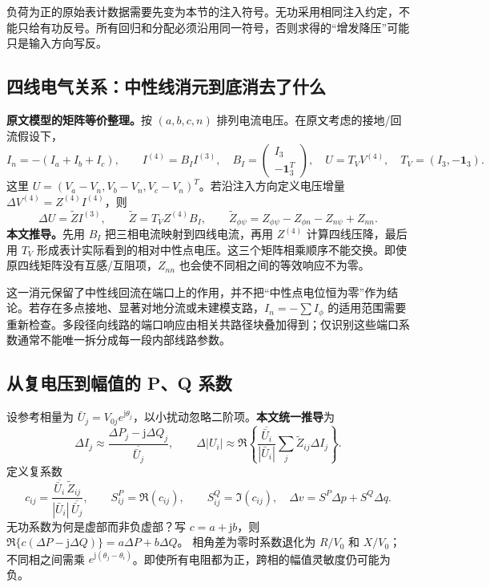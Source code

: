 负荷为正的原始表计数据需要先变为本节的注入符号。无功采用相同注入约定，不能只给有功反号。所有回归和分配必须沿用同一符号，否则求得的“增发降压”可能只是输入方向写反。

\subsection{四线电气关系：中性线消元到底消去了什么}

\textbf{原文模型的矩阵等价整理。}按 $(a,b,c,n)$ 排列电流电压。在原文考虑的接地/回流假设下，
\begin{equation}
 I_n=-(I_a+I_b+I_c),\qquad
 I^{(4)}=B_I I^{(3)},\quad
 B_I=\begin{pmatrix}I_3\\-\boldsymbol1_3^T\end{pmatrix},\quad
 U=T_VV^{(4)},\quad T_V=(I_3,-\boldsymbol1_3).
 \label{eq:oe_s10_neutral}
\end{equation}
这里 $U=(V_a-V_n,V_b-V_n,V_c-V_n)^T$。若沿注入方向定义电压增量
$\Delta V^{(4)}=Z^{(4)}I^{(4)}$，则
\begin{equation}
 \Delta U=\widetilde ZI^{(3)},\qquad
 \widetilde Z=T_VZ^{(4)}B_I,\qquad
 \widetilde Z_{\phi\psi}=Z_{\phi\psi}-Z_{\phi n}-Z_{n\psi}+Z_{nn}.
 \label{eq:oe_s10_fourwire}
\end{equation}
\textbf{本文推导。}先用 $B_I$ 把三相电流映射到四线电流，再用 $Z^{(4)}$ 计算四线压降，最后用 $T_V$ 形成表计实际看到的相对中性点电压。这三个矩阵相乘顺序不能交换。即使原四线矩阵没有互感/互阻项，$Z_{nn}$ 也会使不同相之间的等效响应不为零。

这一消元保留了中性线回流在端口上的作用，并不把“中性点电位恒为零”作为结论。若存在多点接地、显著对地分流或未建模支路，$I_n=-\sum I_\phi$ 的适用范围需要重新检查。多段径向线路的端口响应由相关共路径块叠加得到；仅识别这些端口系数通常不能唯一拆分成每一段内部线路参数。

\subsection{从复电压到幅值的 P、Q 系数}

设参考相量为 $\bar U_j=V_{0j}e^{\mathrm j\theta_j}$，以小扰动忽略二阶项。\textbf{本文统一推导}为
\begin{equation}
 \Delta I_j\approx\frac{\Delta P_j-\mathrm j\Delta Q_j}{\overline{\bar U_j}},\qquad
 \Delta|U_i|\approx\Re\left\{\frac{\overline{\bar U_i}}{|\bar U_i|}
          \sum_j\widetilde Z_{ij}\Delta I_j\right\}.
 \label{eq:oe_s10_differential}
\end{equation}
定义复系数
\begin{equation}
 c_{ij}=\frac{\overline{\bar U_i}\,\widetilde Z_{ij}}
 {|\bar U_i|\,\overline{\bar U_j}},\qquad
 S^P_{ij}=\Re(c_{ij}),\qquad S^Q_{ij}=\Im(c_{ij}),
 \quad \Delta v=S^P\Delta p+S^Q\Delta q.
 \label{eq:oe_s10_sensitivity}
\end{equation}
无功系数为何是虚部而非负虚部？写 $c=a+\mathrm jb$，则
$\Re\{c(\Delta P-\mathrm j\Delta Q)\}=a\Delta P+b\Delta Q$。
相角差为零时系数退化为 $R/V_0$ 和 $X/V_0$；不同相之间需乘
$e^{\mathrm j(\theta_j-\theta_i)}$。即使所有电阻都为正，跨相的幅值灵敏度仍可能为负。

